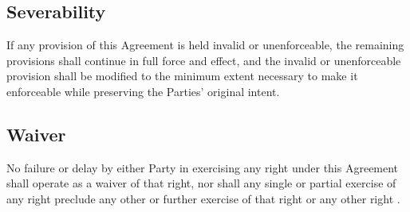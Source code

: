 \subsection{Severability} If any provision of this Agreement is held invalid or unenforceable, the remaining provisions shall continue in full force and effect, and the invalid or unenforceable provision shall be modified to the minimum extent necessary to make it enforceable while preserving the Parties' original intent.

\subsection{Waiver} No failure or delay by either Party in exercising any right under this Agreement shall operate as a waiver of that right, nor shall any single or partial exercise of any right preclude any other or further exercise of that right or any other right \cite{whitfield2025mnda}.
